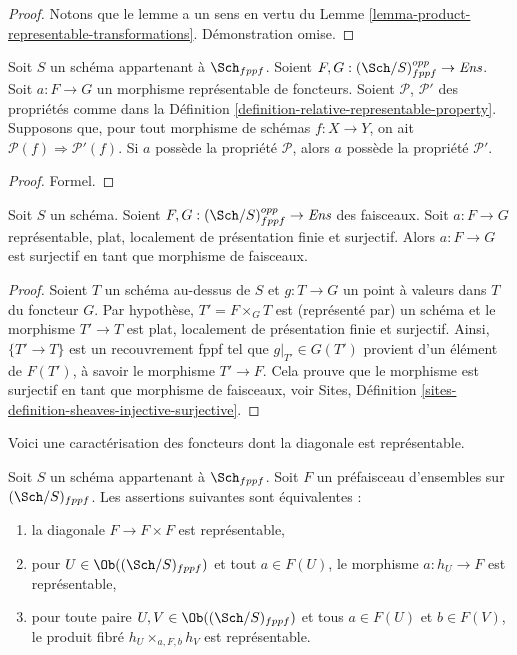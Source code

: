 \begin{proof}
Notons que le lemme a un sens en vertu du
Lemme \ref{lemma-product-representable-transformations}.
Démonstration omise.
\end{proof}

\begin{lemma}
\label{lemma-representable-transformations-property-implication}
Soit $S$ un schéma appartenant à $\Sch_{fppf}$.
Soient $F, G : (\Sch/S)_{fppf}^{opp} \to \textit{Ens}$.
Soit $a : F \to G$ un morphisme représentable de foncteurs.
Soient $\mathcal{P}$, $\mathcal{P}'$ des propriétés comme dans la
Définition \ref{definition-relative-representable-property}.
Supposons que, pour tout morphisme de schémas $f : X \to Y$,
on ait $\mathcal{P}(f) \Rightarrow \mathcal{P}'(f)$.
Si $a$ possède la propriété $\mathcal{P}$, alors
$a$ possède la propriété $\mathcal{P}'$.
\end{lemma}

\begin{proof}
Formel.
\end{proof}

\begin{lemma}
\label{lemma-surjective-flat-locally-finite-presentation}
Soit $S$ un schéma.
Soient $F, G : (\Sch/S)_{fppf}^{opp} \to \textit{Ens}$ des faisceaux.
Soit $a : F \to G$ représentable, plat,
localement de présentation finie et surjectif.
Alors $a : F \to G$ est surjectif en tant que morphisme de faisceaux.
\end{lemma}

\begin{proof}
Soient $T$ un schéma au-dessus de $S$ et $g : T \to G$ un point à valeurs dans $T$ du foncteur
$G$. Par hypothèse, $T' = F \times_G T$ est (représenté par) un schéma et
le morphisme $T' \to T$ est plat, localement de présentation finie et
surjectif. Ainsi, $\{T' \to T\}$ est un recouvrement fppf tel
que $g|_{T'} \in G(T')$ provient d'un élément de $F(T')$, à savoir
le morphisme $T' \to F$. Cela prouve que le morphisme est surjectif en tant que
morphisme de faisceaux, voir
Sites, Définition \ref{sites-definition-sheaves-injective-surjective}.
\end{proof}

\noindent
Voici une caractérisation des foncteurs dont la
diagonale est représentable.

\begin{lemma}
\label{lemma-representable-diagonal}
Soit $S$ un schéma appartenant à $\Sch_{fppf}$.
Soit $F$ un préfaisceau d'ensembles sur $(\Sch/S)_{fppf}$.
Les assertions suivantes sont équivalentes :
\begin{enumerate}
\item la diagonale $F \to F \times F$ est représentable,
\item pour $U \in \Ob((\Sch/S)_{fppf})$ et tout $a \in F(U)$,
le morphisme $a : h_U \to F$ est représentable,
\item pour toute paire $U, V \in \Ob((\Sch/S)_{fppf})$
et tous $a \in F(U)$ et $b \in F(V)$, le produit fibré
$h_U \times_{a, F, b} h_V$ est représentable.
\end{enumerate}
\end{lemma}


